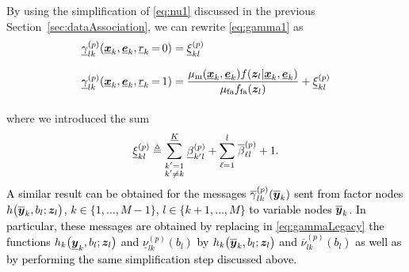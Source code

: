 \documentclass[10pt, twoside, romanappendices]{IEEEtran}
\providecommand{\rd}{\textcolor{black}}
\providecommand{\ist}{\hspace*{.3mm}}
\providecommand{\rmv}{\hspace*{-.3mm}}
\providecommand{\nn}{\nonumber}
\begin{document}
By using the simplification of \eqref{eq:nu1} discussed in the previous Section~\ref{sec:dataAssociation}, we can \vspace{1.5mm} rewrite \eqref{eq:gamma1} as
\begin{align}
\underline{\gamma}^{(p)}_{lk}(\underline{\V{x}}_{k}, \underline{\V{e}}_{k}, \underline{r}_k \rmv=\rmv 0)  &= \underline{\xi}_{kl}^{(p)} \nn\\[2.5mm]
\underline{\gamma}^{(p)}_{lk}(\underline{\V{x}}_{k}, \underline{\V{e}}_{k}, \underline{r}_k \rmv=\rmv 1) &= \frac{\mu_{\mathrm{m}}(\underline{\V{x}}_{k},\underline{\V{e}}_{k}) f(\V{z}_{l}| \underline{\V{x}}_k, \underline{\V{e}}_{k})}{\mu_{\mathrm{fa}}  f_{\mathrm{fa}}(\V{z}_{l})} + \underline{\xi}_{kl}^{(p)} \label{eq:measUpdate} \\[-3mm]
\nn
\end{align}
where we introduced the \vspace{1.5mm} sum
\begin{equation}
\underline{\xi}_{kl}^{(p)} \triangleq \sum^{\underline{K}}_{\substack{k'=1\\k' \neq k}} \ist \underline{\beta}_{k'l}^{(p)} + \sum^{l}_{\substack{\ell=1}} \ist \overline{\beta}_{\ell l}^{(p)} + 1. \label{eq:sumMessages}
\end{equation}
\rd{A similar result can be obtained for the messages $\overline{\gamma}^{(p)}_{lk}(\overline{\bm{y}}_{k}) $ sent from factor \vspace{.3mm} nodes $h\big( \overline{\bm{y}}_{k}, b_l; \bm{z}_l \big)$, $k \in \{1,\dots,M-1\}$, $l \in \{k+1,\dots,M\}$ to variable nodes $\overline{\bm{y}}_{k}$. In particular, these messages are obtained by replacing \vspace{-.5mm} in \eqref{eq:gammaLegacy} the functions $h_k\big( \underline{\bm{y}}_{k}, b_{l}; \bm{z}_l \big)$ and $\underline{\nu}_{l k}^{(p)}(b_l)$ by $h_k\big( \overline{\bm{y}}_{k}, b_l; \bm{z}_l \big)$ and $\overline{\nu}_{l k}^{(p)}(b_l)$ as well as by performing the same simplification step discussed above.} 
\end{document}
